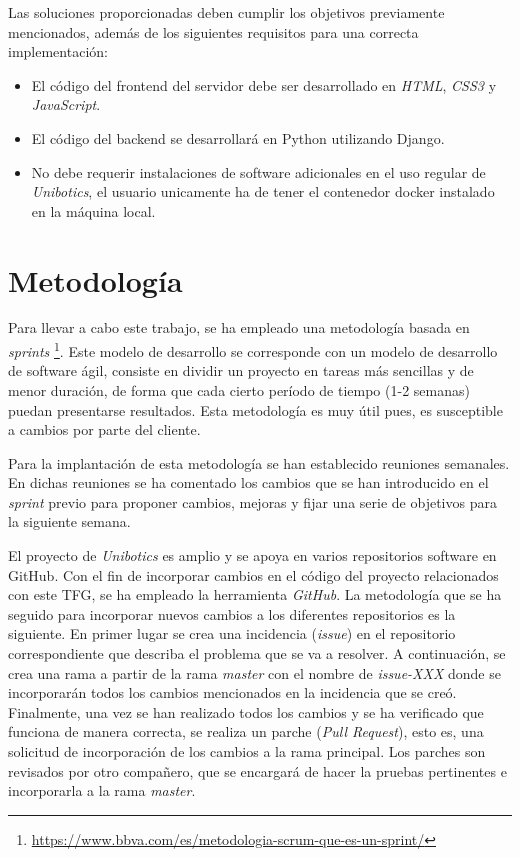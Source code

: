 \documentclass[a4paper, 12pt]{book}
\begin{document}
Las soluciones proporcionadas deben cumplir los objetivos previamente mencionados, además de los siguientes requisitos para una correcta implementación:

\begin{itemize}
\item El código del frontend del servidor debe ser desarrollado en \emph{HTML}, \emph{CSS3} y \emph{JavaScript}.
\item El código del backend se desarrollará en Python utilizando Django.
\item No debe requerir instalaciones de software adicionales en el uso regular de \emph{Unibotics}, el usuario unicamente ha de tener el contenedor docker instalado en la máquina local.
\end{itemize}

\section{Metodología}
\label{sec:metodologia}

Para llevar a cabo este trabajo, se ha empleado una metodología basada en \emph{sprints} \footnote{\url{https://www.bbva.com/es/metodologia-scrum-que-es-un-sprint/}}. Este modelo de desarrollo se corresponde con un modelo de desarrollo de software ágil, consiste en dividir un proyecto en tareas más sencillas y de menor duración, de forma que cada cierto período de tiempo (1-2 semanas) puedan presentarse resultados. Esta metodología es muy útil pues, es susceptible a cambios por parte del cliente.

Para la implantación de esta metodología se han establecido reuniones semanales. En dichas reuniones se ha comentado los cambios que se han introducido en el \emph{sprint} previo para proponer cambios, mejoras y fijar una serie de objetivos para la siguiente semana.

El proyecto de \emph{Unibotics} es amplio y se apoya en varios repositorios software en GitHub. Con el fin de incorporar cambios en el código del proyecto relacionados con este TFG, se ha empleado la herramienta \emph{GitHub}. La metodología que se ha seguido para incorporar nuevos cambios a los diferentes repositorios es la siguiente. En primer lugar se crea una incidencia (\emph{issue}) en el repositorio correspondiente que describa el problema que se va a resolver. A continuación, se crea una rama a partir de la rama \emph{master} con el nombre de \emph{issue-XXX} donde se incorporarán todos los cambios mencionados en la incidencia que se creó. Finalmente, una vez se han realizado todos los cambios y se ha verificado que funciona de manera correcta, se realiza un parche (\emph{Pull Request}), esto es, una solicitud de incorporación de los cambios a la rama principal. Los parches son revisados por otro compañero, que se encargará de hacer la pruebas pertinentes e incorporarla a la rama \emph{master}.
\end{document}
